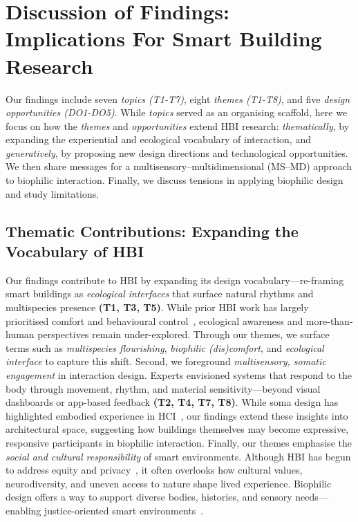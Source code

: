 \section{Discussion of Findings: Implications For Smart Building Research}
\label{sec:ch4-discussions}
Our findings include seven \emph{topics (T1-T7)}, eight \emph{themes (T1-T8)}, and five \emph{design opportunities (DO1-DO5)}. While \emph{topics} served as an organising scaffold, here we focus on how the \emph{themes} and \emph{opportunities} extend HBI research: \emph{thematically}, by expanding the experiential and ecological vocabulary of interaction, and \emph{generatively}, by proposing new design directions and technological opportunities. We then share messages for a multisensory–multidimensional (MS–MD) approach to biophilic interaction. Finally, we discuss tensions in applying biophilic design and study limitations.

\subsection{Thematic Contributions: Expanding the Vocabulary of HBI} 
Our findings contribute to HBI by expanding its design vocabulary---re-framing smart buildings as \emph{ecological interfaces} that surface natural rhythms and multispecies presence \textbf{(T1, T3, T5)}. While prior HBI work has largely prioritised comfort and behavioural control~\cite{alavi2017comfort, nguyen2024adaptive}, ecological awareness and more-than-human perspectives remain under-explored. Through our themes, we surface terms such as \emph{multispecies flourishing}, \emph{biophilic (dis)comfort}, and \emph{ecological interface} to capture this shift. Second, we foreground \emph{multisensory, somatic engagement} in interaction design. Experts envisioned systems that respond to the body through movement, rhythm, and material sensitivity---beyond visual dashboards or app-based feedback \textbf{(T2, T4, T7, T8)}. While soma design has highlighted embodied experience in HCI~\cite{hook2018designing}, our findings extend these insights into architectural space, suggesting how buildings themselves may become expressive, responsive participants in biophilic interaction. Finally, our themes emphasise the \emph{social and cultural responsibility} of smart environments. Although HBI has begun to address equity and privacy~\cite{mitchell2020human}, it often overlooks how cultural values, neurodiversity, and uneven access to nature shape lived experience. Biophilic design offers a way to support diverse bodies, histories, and sensory needs—enabling justice-oriented smart environments~\cite{chordia2024social}.

